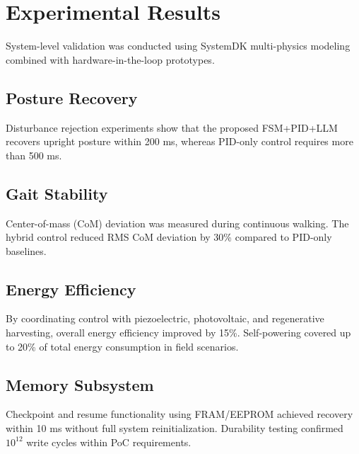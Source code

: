 \section{Experimental Results}
System-level validation was conducted using SystemDK multi-physics modeling
combined with hardware-in-the-loop prototypes.

\subsection{Posture Recovery}
Disturbance rejection experiments show that the proposed FSM+PID+LLM
recovers upright posture within 200 ms,
whereas PID-only control requires more than 500 ms.

\subsection{Gait Stability}
Center-of-mass (CoM) deviation was measured during continuous walking.
The hybrid control reduced RMS CoM deviation by 30\% compared to PID-only baselines.

\subsection{Energy Efficiency}
By coordinating control with piezoelectric, photovoltaic, and regenerative harvesting,
overall energy efficiency improved by 15\%.
Self-powering covered up to 20\% of total energy consumption in field scenarios.

\subsection{Memory Subsystem}
Checkpoint and resume functionality using FRAM/EEPROM
achieved recovery within 10 ms without full system reinitialization.
Durability testing confirmed $10^{12}$ write cycles within PoC requirements.
